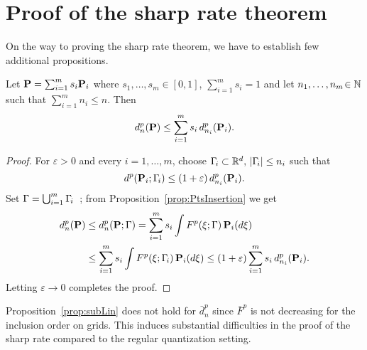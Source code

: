 \section{Proof of the sharp rate theorem}\label{sec:rate}

On the way to proving the sharp rate theorem, we have to establish few additional 
propositions.

\begin{prop}\label{prop:subLin}
Let $\mathbf{P} = \sum_{i=1}^m s_i \mathbf{P}_i$ where $s_1,\ldots,s_m\!\in [0,1]$,  $\sum_{i=1}^m s_i = 1$ and let $n_1,\ldots,n_m\!\in \mathbb{N}$ such that $\sum_{i=1}^m n_i \leq n$.
Then
\[
d_{n}^p(\mathbf{P}) \leq \sum_{i=1}^m s_i\, d_{n_i}^p(\mathbf{P}_i).
\]
\end{prop}
\begin{proof}
For $\varepsilon > 0$ and every $i = 1, \ldots, m$, choose $\Gamma_{\!i} \subset
\mathbb{R}^d,\,\lvert\Gamma_{\!i}\rvert \leq n_i$ such that 
\[
d^p(\mathbf{P}_i; \Gamma_{\!i}) \leq (1+\varepsilon)\, d_{n_i}^p(\mathbf{P}_i).
\]
% 
Set $\Gamma =
\bigcup_{i=1}^m \Gamma_{\!i}$~; from Proposition~\ref{prop:PtsInsertion} we get
\begin{eqnarray*}
\begin{split}
  d_{n}^p(\mathbf{P}) & \leq d_{n}^p(\mathbf{P}; \Gamma) = \sum_{i=1}^m s_i \int F^p(\xi; \Gamma)\,\mathbf{P}_i(d\xi)\\
  & \leq \sum_{i=1}^m s_i \int F^p(\xi; \Gamma_{\!i})\,\mathbf{P}_i(d\xi)  \leq (1+\varepsilon) \sum_{i=1}^m s_i\, d_{n_i}^p(\mathbf{P}_i).
\end{split}
\end{eqnarray*}
Letting $\varepsilon\to 0$ completes the proof.
\end{proof}

\begin{remark}
Proposition~\ref{prop:subLin} does not hold for $\bar d_n^p$ since $\bar F^p$ is not decreasing for the inclusion order on grids.
%
This induces substantial difficulties in the proof of the
sharp rate compared to the regular quantization setting.
\end{remark}


